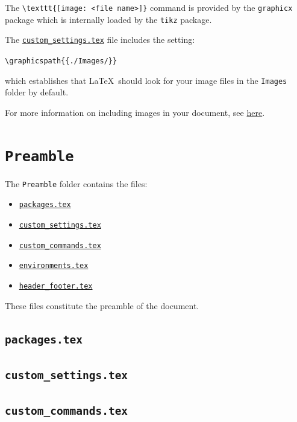 The \lstinline|\texttt{[image: <file name>]}| command is provided by the \texttt{graphicx} package which is internally loaded by the \texttt{tikz} package.

The \hyperref[sec:custom_settings.tex]{\texttt{custom\_settings.tex}} file includes the setting:
\begin{center}
    \lstinline|\graphicspath{{./Images/}}|
\end{center}
which establishes that \LaTeX\ should look for your image files in the \texttt{Images} folder by default.

For more information on including images in your document, see \href{https://en.wikibooks.org/wiki/LaTeX/Importing_Graphics}{here}.

\section{\texttt{Preamble}}
\label{sec:preamble}

The \texttt{Preamble} folder contains the files:
\begin{itemize}
    \item \hyperref[sec:packages.tex]{\texttt{packages.tex}}
    \item \hyperref[sec:custom_settings.tex]{\texttt{custom\_settings.tex}}
    \item \hyperref[sec:custom_commands.tex]{\texttt{custom\_commands.tex}}
    \item \hyperref[sec:environments.tex]{\texttt{environments.tex}}
    \item \hyperref[sec:header_footer.tex]{\texttt{header\_footer.tex}}
\end{itemize}
These files constitute the preamble of the document.

\subsection{\texttt{packages.tex}}
\label{sec:packages.tex}

\subsection{\texttt{custom\_settings.tex}}
\label{sec:custom_settings.tex}

\subsection{\texttt{custom\_commands.tex}}
\label{sec:custom_commands.tex}

